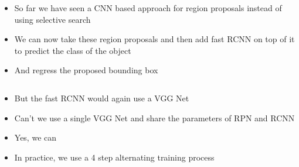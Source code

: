 			
\begin{frame}
	\begin{columns}
			
		\begin{overlayarea}{\textwidth}{\textheight}
			\begin{itemize}
				\justifying
				\item<2-> So far we have seen a CNN based approach for region proposals instead of using selective search
				\item<3-> We can now take these region proposals and then add fast RCNN on top of it to predict the class of the object
				\item <4-> And regress the proposed bounding box
			\end{itemize}
		\end{overlayarea}
	\end{columns}
\end{frame}
						

\begin{frame}
	\begin{columns}
		\column{0.5\textwidth}
			
		\column{0.5\textwidth}
		\begin{overlayarea}{\textwidth}{\textheight}
			\begin{itemize}
				\justifying
				\item<2-> But the fast RCNN would again use a VGG Net
				\item<3-> Can't we use a single VGG Net and share the parameters of RPN and RCNN
				\item <4-> Yes, we can
				\item <5> In practice, we use a 4 step alternating training process
			\end{itemize}
		\end{overlayarea}
	\end{columns}
\end{frame}

			
